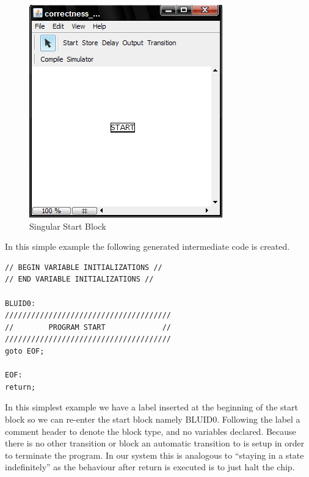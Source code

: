 \begin{figure}[htb]
	\centering
	\includegraphics[width=\imgmedphoto]{./images/correctness_ex_start.png}
	\caption{Singular Start Block}
	\label{fig:correctness_ex_start}
\end{figure}
In this simple example the following generated intermediate code  is created.

\begin{minipage}{\textwidth}
\begin{lstlisting}[frame=single]
// BEGIN VARIABLE INITIALIZATIONS //
// END VARIABLE INITIALIZATIONS //

BLUID0:
//////////////////////////////////////
//        PROGRAM START             //
//////////////////////////////////////
goto EOF;

EOF:
return;
\end{lstlisting}
\end{minipage}

In this simplest example we have a label inserted at the beginning of the start block so we can re-enter the start block namely BLUID0. Following the label a comment header to denote the block type, and no variables declared.  Because there is no other transition or block an automatic transition to  is setup in order to terminate the program. In our system this is analogous to ``staying in a state indefinitely'' as the behaviour after return is executed is to just halt the chip.

